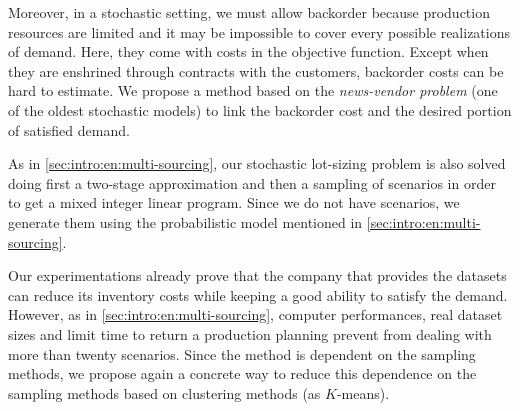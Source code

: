 Moreover, in a stochastic setting, we must allow backorder because production resources are limited and it may be impossible to cover every possible realizations of demand.
Here, they come with costs in the objective function.
Except when they are enshrined through contracts with the customers, backorder costs can be hard to estimate.
We propose a method based on the \emph{news-vendor problem} (one of the oldest stochastic models) to link the backorder cost and the desired portion of satisfied demand.


As in \cref{sec:intro:en:multi-sourcing}, our stochastic lot-sizing problem is also solved doing first a two-stage approximation and then a sampling of scenarios in order to get a mixed integer linear program.
Since we do not have scenarios, we generate them using the probabilistic model mentioned in \cref{sec:intro:en:multi-sourcing}.


\medskip


Our experimentations already prove that the company that provides the datasets can reduce its inventory costs while keeping a good ability to satisfy the demand.
However, as in \cref{sec:intro:en:multi-sourcing}, computer performances, real dataset sizes and limit time to return a production planning prevent from dealing with more than twenty scenarios.
Since the method is dependent on the sampling methods, we propose again a concrete way to reduce this dependence on the sampling methods based on clustering methods (as $K$-means).


